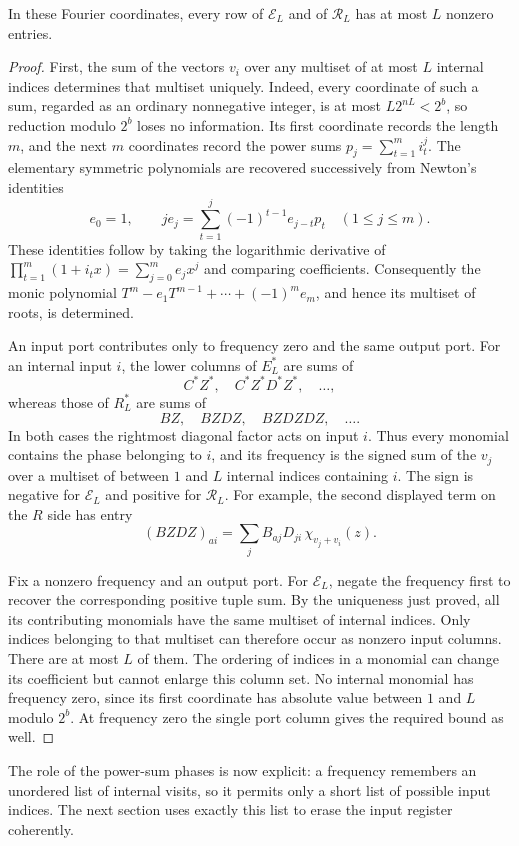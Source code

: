 \begin{proposition}\label{fields:sparsity}
In these Fourier coordinates, every row of $\mathcal E_L$ and of
$\mathcal R_L$ has at most $L$ nonzero entries.
\end{proposition}

\begin{proof}
First, the sum of the vectors $v_i$ over any multiset of at most $L$
internal indices determines that multiset uniquely. Indeed, every coordinate
of such a sum, regarded as an ordinary nonnegative integer, is at most
$L2^{nL}<2^b$, so reduction modulo $2^b$ loses no information. Its first
coordinate records the length $m$, and the next $m$ coordinates record the
power sums $p_j=\sum_{t=1}^m i_t^j$. The elementary symmetric polynomials
are recovered successively from Newton's identities
\[
 e_0=1,\qquad
 j e_j=\sum_{t=1}^j(-1)^{t-1}e_{j-t}p_t\quad(1\le j\le m).
\]
These identities follow by taking the logarithmic derivative of
$\prod_{t=1}^m(1+i_t x)=\sum_{j=0}^m e_jx^j$ and comparing coefficients.
Consequently the monic polynomial
$T^m-e_1T^{m-1}+\cdots+(-1)^me_m$, and hence its multiset of roots,
is determined.

An input port contributes only to frequency zero and the same output port.
For an internal input $i$, the lower columns of $E_L^*$ are sums of
\[
 C^*Z^*,\quad C^*Z^*D^*Z^*,\quad\ldots,
\]
whereas those of $R_L^*$ are sums of
\[
 BZ,\quad BZDZ,\quad BZDZDZ,\quad\ldots.
\]
In both cases the rightmost diagonal factor acts on input $i$. Thus every
monomial contains the phase belonging to $i$, and its frequency is the
signed sum of the $v_j$ over a multiset of between $1$ and $L$ internal
indices containing $i$. The sign is negative for $\mathcal E_L$ and
positive for $\mathcal R_L$. For example, the second displayed term on
the $R$ side has entry
\[
 (BZDZ)_{ai}=\sum_j B_{aj}D_{ji}\,
                  \chi_{v_j+v_i}(z).
\]

Fix a nonzero frequency and an output port. For $\mathcal E_L$, negate
the frequency first to recover the corresponding positive tuple sum.
By the uniqueness just proved,
all its contributing monomials have the same multiset of internal indices.
Only indices belonging to that multiset can therefore occur as nonzero
input columns. There are at most $L$ of them. The ordering of indices in
a monomial can change its coefficient but cannot enlarge this column set.
No internal monomial has frequency zero, since its first coordinate has
absolute value between $1$ and $L$ modulo $2^b$. At frequency zero the
single port column gives the required bound as well.
\end{proof}

The role of the power-sum phases is now explicit: a frequency remembers
an unordered list of internal visits, so it permits only a short list of
possible input indices. The next section uses exactly this list to erase
the input register coherently.
